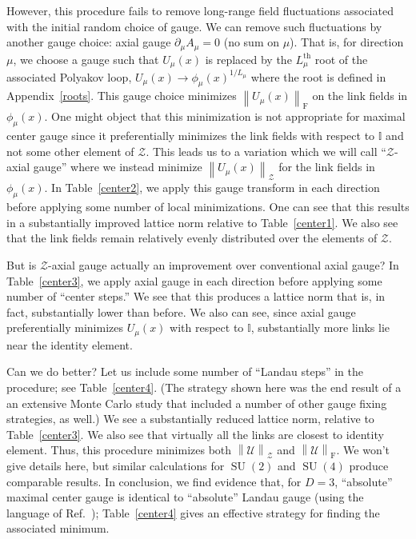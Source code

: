 \documentclass[preprint,aps,prd]{revtex4-2}
\newcommand{\zentrum}{\mathcal{Z}}       %
\newcommand{\config}{\mathcal{U}}
\DeclareMathOperator{\SU}{SU}
\newcommand\fnorm[1]{\left\lVert #1 \right\rVert_\mathrm{F}}
\newcommand\znorm[1]{\left\lVert #1 \right\rVert_\zentrum}
\begin{document}
However, this procedure fails to remove long-range field fluctuations
associated with the initial random choice of gauge.  We can remove
such fluctuations by another gauge choice:  axial gauge
$\partial_\mu A_\mu = 0$ (no sum on $\mu$).
That is, for direction $\mu$, we choose a gauge such that $U_\mu(x)$
is replaced by the $L_\mu^\mathrm{th}$ root of the associated Polyakov loop,
$U_\mu(x) \to \phi_\mu(x)^{1/L_\mu}$ where the root is defined in
Appendix~\ref{roots}.
This gauge choice minimizes $\fnorm{U_\mu(x)}$
on the link fields in $\phi_\mu(x)$.  One might
object that this minimization is not appropriate for maximal center gauge
since it preferentially minimizes the link fields
with respect to $\mathbb{I}$ and not some other element of $\zentrum$.
This leads us to a variation which we will call ``$\zentrum$-axial gauge''
where we instead minimize $\znorm{U_\mu(x)}$
for the link fields in $\phi_\mu(x)$.  In Table~\ref{center2},
we apply this gauge transform in each direction before applying
some number of local minimizations.  One can see that this
results in a substantially improved lattice norm relative to
Table~\ref{center1}.  We also see that the link fields
remain relatively evenly distributed over the elements of $\zentrum$.

But is $\zentrum$-axial gauge actually an improvement over
conventional axial gauge?
In Table~\ref{center3}, we apply axial gauge in each
direction before applying some number of ``center steps.''
We see that this produces a lattice norm that is, in fact,
substantially lower than before.  We also can see, since
axial gauge preferentially minimizes $U_\mu(x)$ with
respect to $\mathbb{I}$, substantially more links lie near
the identity element.

Can we do better? Let us include some number of ``Landau steps''
in the procedure; see Table~\ref{center4}.  (The strategy shown
here was the end result of a an extensive Monte Carlo study that
included a number of other gauge fixing strategies, as well.)
We see a substantially reduced lattice norm, relative to
Table~\ref{center3}.  We also see that virtually all the
links are closest to identity element.  Thus, this procedure
minimizes both $\znorm{\config}$ and $\fnorm{\config}$.
We won't give details here, but similar calculations for
$\SU(2)$ and $\SU(4)$ produce comparable results.
In conclusion, we find evidence that, for $D=3$,
``absolute'' maximal center gauge is identical to ``absolute''
Landau gauge (using the language of Ref.~\cite{maas_more_2009});
Table~\ref{center4} gives
an effective strategy for finding the associated minimum.
\end{document}
